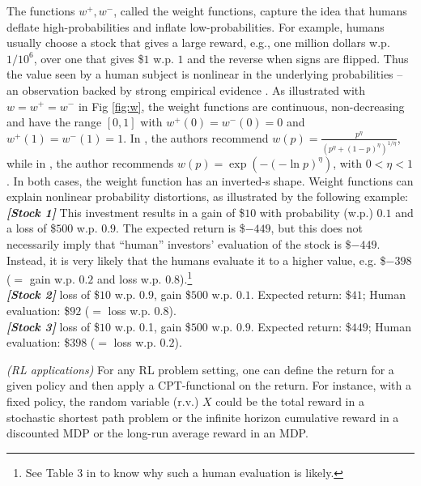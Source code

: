The functions $w^+, w^-$, called the weight functions, capture the idea that humans deflate high-probabilities and inflate low-probabilities.
For example, humans usually choose a stock that gives a large reward, e.g., 
one million dollars w.p. $1/10^6$, over one that gives \$$1$ w.p. $1$ and the reverse when signs are flipped. 
Thus the value seen by a human subject is nonlinear in the underlying probabilities -- an observation backed by strong empirical evidence \cite{tversky1992advances,Barberis:2012vs}.  
As illustrated with $w=w^+=w^-$ in Fig \ref{fig:w}, the weight functions are continuous, non-decreasing and  have the range $[0,1]$ with $w^+(0)=w^-(0)=0$ and $w^+(1)=w^-(1)=1$. 
In \cite{tversky1992advances}, the authors recommend $w(p) = \frac{p^{\eta}}{{(p^{\eta}+ (1-p)^{\eta})}^{1/\eta}}$, while in \cite{prelec1998probability}, the author recommends $w(p) = \exp(-(-\ln p)^\eta)$, with $0 < \eta <1$. In both cases, the weight function has an inverted-s shape.
Weight functions can explain nonlinear probability distortions, as illustrated by the following example: \\
\textit{\textbf{[Stock 1]}} This investment results in a gain of \$$10$ with probability (w.p.) $0.1$ and a loss of \$$500$ w.p. $0.9$. The expected return is \$$-449$, but this does not necessarily imply that ``human'' investors' evaluation of the stock is \$$-449$. Instead, it is very likely that the humans evaluate it to a higher value, e.g. \$$-398$ ($=$ gain w.p. $0.2$ and loss w.p. $0.8$).\footnote{See Table 3 in \cite{tversky1992advances} to know why such a human evaluation is likely.}\\
\textit{\textbf{[Stock 2]}} loss of \$$10$ w.p. $0.9$, gain \$$500$ w.p. $0.1$. Expected return: \$$41$; Human evaluation: \$$92$ ($=$ loss w.p. $0.8$).\\
\textit{\textbf{[Stock 3]}} loss of \$$10$ w.p. 0.1, gain \$$500$ w.p. $0.9$. Expected return: \$$449$; Human evaluation: \$$398$ ($=$ loss w.p. $0.2$). 
\fi



\begin{remark}\textit{(RL applications)}
For any RL problem setting, one can define the return for a given policy and then apply a CPT-functional on the return. For instance, with a fixed policy, the random variable (r.v.) $X$ could be the total reward in a stochastic shortest path problem or the infinite horizon cumulative reward in a discounted MDP or the long-run average reward in an MDP.
\end{remark}


